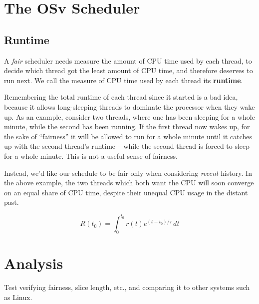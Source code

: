 \documentclass{sig-alternate}
\begin{document}
\section{The OSv Scheduler}
\subsection{Runtime}
A \emph{fair} scheduler needs measure the amount of CPU time used by
each thread, to decide which thread got the least amount of CPU
time, and therefore deserves to run next. We call the measure of CPU time
used by each thread its {\bf runtime}.

Remembering the total runtime of each thread since it started
is a bad idea, because it allows long-sleeping threads to dominate the
processor when they wake up. As an example, consider two threads,
where one has been sleeping for a whole minute, while the second has been
running. If the first thread now wakes up, for the sake of ``fairness''
it will be allowed to run for a whole minute until it catches up with the
second thread's runtime -- while the second thread is forced to sleep for
a whole minute. This is not a useful sense of fairness.

Instead, we'd like our schedule to be fair only when considering \emph{recent}
history. In the above example, the two threads which both want the CPU will
soon converge on an equal share of CPU time, despite their unequal CPU usage
in the distant past.

\begin{equation}
R(t_0) = \int^{t_0}_{0}\!r(t)e^{(t-t_0)/\tau}\,dt
\end{equation}


\section{Analysis}
Test verifying fairness, slice length, etc., and comparing it to other
systems such as Linux.

%
%
\end{document}
